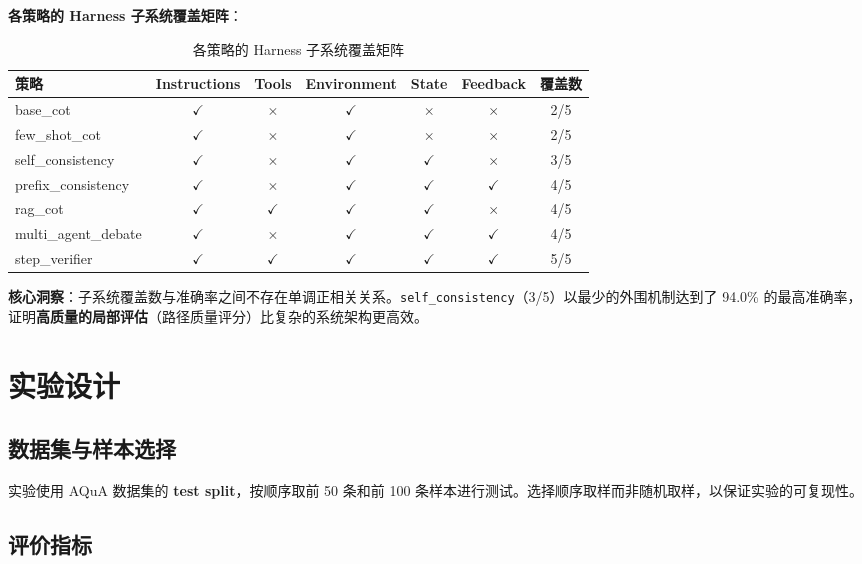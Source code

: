 \documentclass[lang=cn,a4paper,newtx]{elegantpaper}
\begin{document}
\textbf{各策略的 Harness 子系统覆盖矩阵}：

\begin{table}[htbp]
\centering
\caption{各策略的 Harness 子系统覆盖矩阵}
\begin{tabular}{lccccc|c}
\toprule
策略 & Instructions & Tools & Environment & State & Feedback & 覆盖数 \\
\midrule
base\_cot & $\checkmark$ & $\times$ & $\checkmark$ & $\times$ & $\times$ & 2/5 \\
few\_shot\_cot & $\checkmark$ & $\times$ & $\checkmark$ & $\times$ & $\times$ & 2/5 \\
self\_consistency & $\checkmark$ & $\times$ & $\checkmark$ & $\checkmark$ & $\times$ & 3/5 \\
prefix\_consistency & $\checkmark$ & $\times$ & $\checkmark$ & $\checkmark$ & $\checkmark$ & 4/5 \\
rag\_cot & $\checkmark$ & $\checkmark$ & $\checkmark$ & $\checkmark$ & $\times$ & 4/5 \\
multi\_agent\_debate & $\checkmark$ & $\times$ & $\checkmark$ & $\checkmark$ & $\checkmark$ & 4/5 \\
step\_verifier & $\checkmark$ & $\checkmark$ & $\checkmark$ & $\checkmark$ & $\checkmark$ & 5/5 \\
\bottomrule
\end{tabular}
\end{table}

\textbf{核心洞察}：子系统覆盖数与准确率之间不存在单调正相关关系。\texttt{self\_consistency}（3/5）以最少的外围机制达到了 94.0\% 的最高准确率，证明\textbf{高质量的局部评估}（路径质量评分）比复杂的系统架构更高效。

\section{实验设计}

\subsection{数据集与样本选择}

实验使用 AQuA 数据集的 \textbf{test split}，按顺序取前 50 条和前 100 条样本进行测试。选择顺序取样而非随机取样，以保证实验的可复现性。

\subsection{评价指标}
\end{document}
